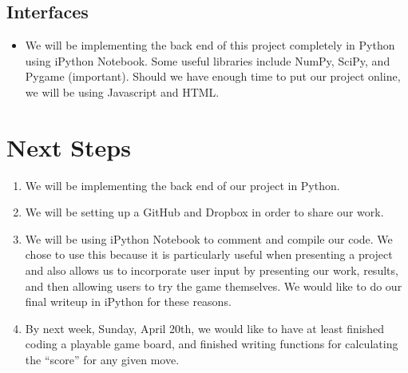 \documentclass[11pt]{article}
\begin{document}
\subsection*{Interfaces}
\begin{itemize}
\item We will be implementing the back end of this project completely in Python using iPython Notebook. Some useful libraries include NumPy, SciPy, and Pygame (important). Should we have enough time to put our project online, we will be using Javascript and HTML.
\end{itemize}


\section{Next Steps}

\begin{enumerate}
\item We will be implementing the back end of our project in Python. 
\item We will be setting up a GitHub and Dropbox in order to share our work.
\item We will be using iPython Notebook to comment and compile our code. We chose to use this because it is particularly useful when presenting a project and also allows us to incorporate user input by presenting our work, results, and then allowing users to try the game themselves. We would like to do our final writeup in iPython for these reasons. 
\item By next week, Sunday, April 20th, we would like to have at least finished coding a playable game board, and finished writing functions for calculating the ``score'' for any given move. 
\end{enumerate}
\end{document}
